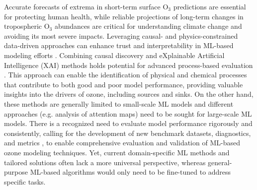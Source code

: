 \documentclass[gmd, manuscript]{copernicus}
\begin{document}
Accurate forecasts of extrema in short-term surface O$_3$ predictions are essential for protecting human health, while reliable projections of long-term changes in tropospheric O$_3$ abundances are critical for understanding climate change and avoiding its most severe impacts. Leveraging causal- and physics-constrained data-driven approaches can enhance trust and interpretability in ML-based modeling efforts \citep{Tesch2023,Beucler2024}. Combining causal discovery and eXplainable Artificial Intelligence (XAI) methods holds potential for advanced process-based evaluation \citep{IglesiasSuarez2024}. This approach can enable the identification of physical and chemical processes that contribute to both good and poor model performance, providing valuable insights into the drivers of ozone, including sources and sinks. On the other hand, these methods are generally limited to small-scale ML models and different approaches (e.g. analysis of attention maps) need to be sought for large-scale ML models. There is a recognized need to evaluate model performance rigorously and consistently, calling for the development of new benchmark datasets, diagnostics, and metrics \citep{Betancourt2021, betancourt_global_2022}, to enable comprehensive evaluation and validation of ML-based ozone modeling techniques. Yet, current domain-specific ML methods and tailored solutions often lack a more universal perspective, whereas general-purpose ML-based algorithms would only need to be fine-tuned to address specific tasks. 
\end{document}
